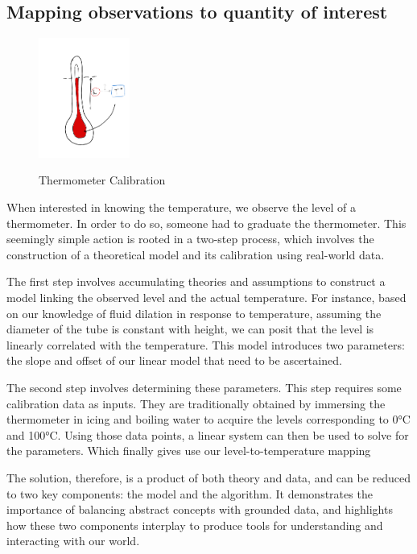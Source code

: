 \begin{bibunit}
\subsection{Mapping observations to quantity of interest}
\begin{figure}[h]
    \centering
        \includegraphics[clip, width=3cm]{Introduction/pics/therm_pb.png}     \\
    \caption{Thermometer Calibration}
    \label{fig:therm_calib}
\end{figure}


When interested in knowing the temperature, we observe the level of a thermometer.
In order to do so, someone had to graduate the thermometer. 
This seemingly simple action is rooted in a two-step process, which involves the construction of a theoretical model and its calibration using real-world data.

The first step involves accumulating theories and assumptions to construct a model linking the observed level and the actual temperature.
For instance, based on our knowledge of fluid dilation in response to temperature, assuming the diameter of the tube is constant with height, we can posit that the level is linearly correlated with the temperature.
This model introduces two parameters: the slope and offset of our linear model that need to be ascertained.

The second step involves determining these parameters. This step requires some calibration data as inputs. They are traditionally obtained by immersing the thermometer in icing and boiling water to acquire the levels corresponding to 0°C and 100°C.
  Using those data points, a linear system can then be used to solve for the parameters. Which finally gives use our level-to-temperature mapping


The solution, therefore, is a product of both theory and data, and can be reduced to two key components: the model and the algorithm. It demonstrates the importance of balancing abstract concepts with grounded data, and highlights how these two components interplay to produce tools for understanding and interacting with our world.


\end{bibunit}
